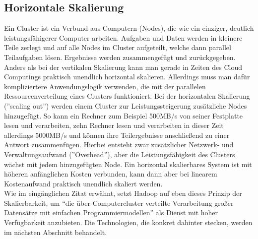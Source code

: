 \subsection{Horizontale Skalierung}
Ein Cluster ist ein Verbund aus Computern (Nodes), die wie ein einziger, deutlich leistungsfähigerer Computer arbeiten.\cite{noauthor_what_nodate} Aufgaben und Daten werden in kleinere Teile zerlegt und auf alle Nodes im Cluster aufgeteilt, welche dann parallel Teilaufgaben lösen. Ergebnisse werden zusammengefügt und zurückgegeben. Anders als bei der vertikalen Skalierung kann man gerade in Zeiten des Cloud Computings praktisch unendlich horizontal skalieren. Allerdings muss man dafür kompliziertere Anwendungslogik verwenden, die mit der parallelen Ressourcenverteilung eines Clusters funktioniert. 
Bei der horizontalen Skalierung (''scaling out'') werden einem Cluster zur Leistungssteigerung zusätzliche Nodes hinzugefügt. So kann ein Rechner zum Beispiel 500MB/s von seiner Festplatte lesen und verarbeiten, zehn Rechner lesen und verarbeiten in dieser Zeit allerdings 5000MB/s und können ihre Teilergebnisse anschließend zu einer Antwort zusammenfügen. Hierbei entsteht zwar zusätzlicher Netzwerk- und Verwaltungsaufwand (''Overhead''), aber die Leistungsfähigkeit des Clusters wächst mit jedem hinzugefügten Node. Ein horizontal skalierbares System ist mit höheren anfänglichen Kosten verbunden, kann dann aber bei linearem Kostenaufwand praktisch unendlich skaliert werden.\cite{noauthor_horizontal_nodate}\\
Wie im eingänglichen Zitat erwähnt, setzt Hadoop auf eben dieses Prinzip der Skalierbarkeit, um ``die über Computercluster verteilte Verarbeitung großer Datensätze mit einfachen Programmiermodellen''\cite{noauthor_apache_nodate} als Dienst mit hoher Verfügbarkeit anzubieten. Die Technologien, die konkret dahinter stecken, werden im nächsten Abschnitt behandelt.

